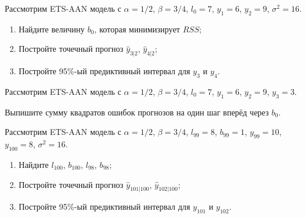 \begin{problem}
  Рассмотрим ETS-AAN модель с $\alpha = 1/2$, $\beta=3/4$, $l_{0}=7$, $y_1=6$, $y_2=9$, $\sigma^2=16$.


  \begin{enumerate}
    \item Найдите величину $b_0$, которая минимизирует $RSS$;
    \item Постройте точечный прогноз $\hat y_{3|2}$, $\hat y_{4|2}$;
     \item Постройте 95\%-ый предиктивный интервал для $y_{3}$ и $y_{4}$.
  \end{enumerate}
\begin{sol}
\end{sol}
\end{problem}

\begin{problem}
  Рассмотрим ETS-AAN модель с $\alpha = 1/2$, $\beta=3/4$, $l_{0}=7$, $y_1=6$, $y_2=9$, $y_3=3$.

  Выпишите сумму квадратов ошибок прогнозов на один шаг вперёд через $b_0$.
\begin{sol}
\end{sol}
\end{problem}



\begin{problem}
  Рассмотрим ETS-AAN модель с $\alpha = 1/2$, $\beta=3/4$, $l_{99}=8$, $b_{99}=1$, $y_{99}=10$, $y_{100}=8$, $\sigma^2=16$.
  \begin{enumerate}
    \item Найдите $l_{100}$, $b_{100}$, $l_{98}$, $b_{98}$;
    \item Постройте точечный прогноз $\hat y_{101|100}$, $\hat y_{102|100}$;
    \item Постройте 95\%-ый предиктивный интервал для $y_{101}$ и $y_{102}$.
  \end{enumerate}
\begin{sol}
\end{sol}
\end{problem}


